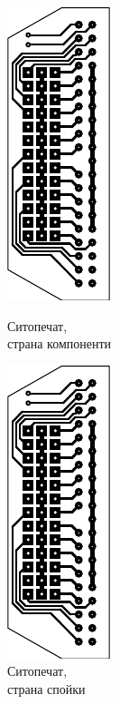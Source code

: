 \begin{figure}[!htbp]
    \begin{minipage}{0.49\linewidth}
        \centering
        \includegraphics[page=3]{documents/pata_board.pdf}
        \caption{Ситопечат,\\страна компоненти}
        \label{fig:pata_top_silk}
    \end{minipage}
    \hfill
    \begin{minipage}{0.49\linewidth}
        \centering
        \includegraphics[page=4]{documents/pata_board.pdf}
        \caption{Ситопечат,\\страна спойки}
        \label{fig:pata_bot_silk}
    \end{minipage}
\end{figure}

